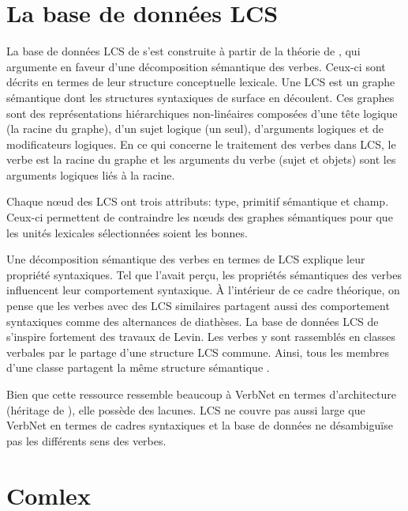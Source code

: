 \section{La base de données \ac{LCS}}
La base de données \ac{LCS} de \cite{DorrUseLexicalSemantics1992} s'est construite à partir de la théorie de \cite{Jackendoff1972-JACSII-2,JackendoffSemanticStructures1992}, qui argumente en faveur d'une décomposition sémantique des verbes. Ceux-ci sont décrits en termes de leur structure conceptuelle lexicale. Une LCS est un graphe sémantique dont les structures syntaxiques de surface en découlent. Ces graphes sont des représentations hiérarchiques non-linéaires composées d'une tête logique (la racine du graphe), d'un sujet logique (un seul), d'arguments logiques et de modificateurs logiques. En ce qui concerne le traitement des verbes dans LCS, le verbe est la racine du graphe et les arguments du verbe (sujet et objets) sont les arguments logiques liés à la racine.

Chaque n\oe{}ud des LCS ont trois attributs: type, primitif sémantique et champ. Ceux-ci permettent de contraindre les n\oe{}uds des graphes sémantiques pour que les unités lexicales sélectionnées soient les bonnes.

Une décomposition sémantique des verbes en termes de LCS explique leur propriété syntaxiques. Tel que \cite{verb-classes.levin.1993} l'avait perçu, les propriétés sémantiques des verbes influencent leur comportement syntaxique. À l'intérieur de ce cadre théorique, on pense que les verbes avec des LCS similaires partagent aussi des comportement syntaxiques comme des alternances de diathèses. La base de données LCS de \cite{DorrUseLexicalSemantics1992} s'inspire fortement des travaux de Levin. Les verbes y sont rassemblés en classes verbales par le partage d'une structure LCS commune. Ainsi, tous les membres d'une classe partagent la même structure sémantique \citep{TraumGenerationLexicalConceptual2000, AyanGeneratingParsingLexicon2002a}.

Bien que cette ressource ressemble beaucoup à VerbNet en termes d'architecture (héritage de \cite{verb-classes.levin.1993}), elle possède des lacunes. \ac{LCS} ne couvre pas aussi large que VerbNet en termes de cadres syntaxiques et la base de données ne désambiguïse pas les différents sens des verbes.


\section{Comlex}\label{comlex}

